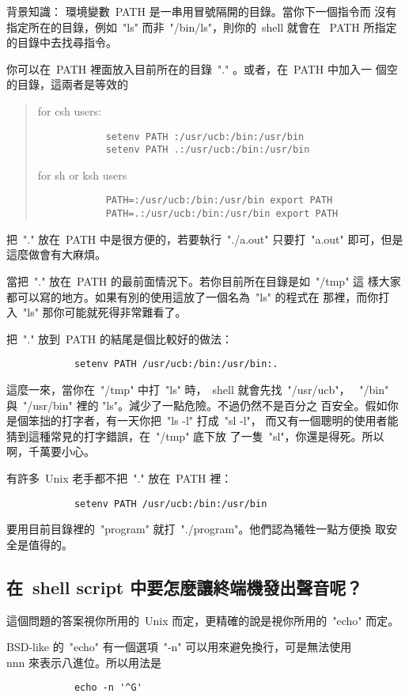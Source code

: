 \documentclass{article}
\begin{document}
\begin{CJK*}{Bg5}{ming}
	背景知識： 環境變數~PATH 是一串用冒號隔開的目錄。當你下一個指令而
	沒有指定所在的目錄，例如~"ls" 而非~"/bin/ls"，則你的~shell 就會在
	~PATH 所指定的目錄中去找尋指令。

	你可以在~PATH 裡面放入目前所在的目錄~"." 。或者，在~PATH 中加入一
	個空的目錄，這兩者是等效的
\begin{quote}
	      for csh users:
\begin{verbatim}
	        setenv PATH :/usr/ucb:/bin:/usr/bin
	        setenv PATH .:/usr/ucb:/bin:/usr/bin
\end{verbatim}
	      for sh or ksh users
\begin{verbatim}
	        PATH=:/usr/ucb:/bin:/usr/bin export PATH
       		PATH=.:/usr/ucb:/bin:/usr/bin export PATH
\end{verbatim}
\end{quote}
	把~"." 放在~PATH 中是很方便的，若要執行~"./a.out" 只要打~"a.out" 
	即可，但是這麼做會有大麻煩。

	當把~"." 放在~PATH 的最前面情況下。若你目前所在目錄是如~"/tmp" 這
	樣大家都可以寫的地方。如果有別的使用這放了一個名為~"ls" 的程式在
	那裡，而你打入~"ls" 那你可能就死得非常難看了。

	把~"." 放到~PATH 的結尾是個比較好的做法：
\begin{verbatim}
	        setenv PATH /usr/ucb:/bin:/usr/bin:.
\end{verbatim}
	這麼一來，當你在~"/tmp" 中打~"ls" 時，~shell 就會先找~"/usr/ucb"，
	~"/bin" 與~"/usr/bin" 裡的 "ls"。減少了一點危險。不過仍然不是百分之
	百安全。假如你是個笨拙的打字者，有一天你把~"ls -l" 打成~"sl -l"，
	而又有一個聰明的使用者能猜到這種常見的打字錯誤，在~"/tmp" 底下放
	了一隻~"sl"，你還是得死。所以啊，千萬要小心。

	有許多~Unix 老手都不把~"." 放在~PATH 裡：
\begin{verbatim}
	        setenv PATH /usr/ucb:/bin:/usr/bin
\end{verbatim}
	要用目前目錄裡的~"program" 就打~"./program"。他們認為犧牲一點方便換
	取安全是值得的。

\subsection{在~shell script 中要怎麼讓終端機發出聲音呢？}

	這個問題的答案視你所用的~Unix 而定，更精確的說是視你所用的~"echo" 
	而定。

	BSD-like 的~"echo" 有一個選項~"-n" 可以用來避免換行，可是無法使用 
	\\nnn 來表示八進位。所以用法是
\begin{verbatim}
	        echo -n '^G'
\end{verbatim}


\end{CJK*}
\end{document}
